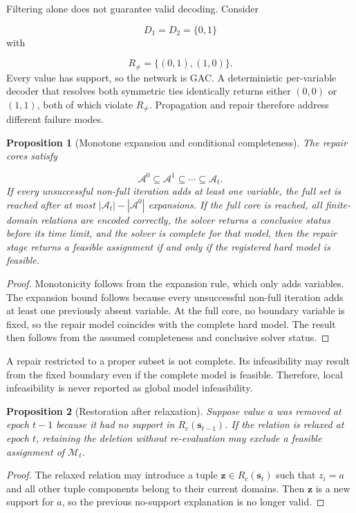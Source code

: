 \documentclass[pdflatex,sn-mathphys-num,iicol,oneside]{sn-jnl}
\newcommand{\gac}{\textsc{GAC}\xspace}
\newtheorem{proposition}{Proposition}
\begin{document}
Filtering alone does not guarantee valid decoding. Consider

\[
D_1=D_2=\{0,1\}
\]
with

\[
R_{\neq}=\{(0,1),(1,0)\}.
\]
Every value has support, so the network is \gac. A deterministic
per-variable decoder that resolves both symmetric ties identically
returns either $(0,0)$ or $(1,1)$, both of which violate
$R_{\neq}$. Propagation and repair therefore address different
failure modes.

\begin{proposition}[Monotone expansion and conditional completeness]
\label{prop:completeness}
The repair cores satisfy

\[
\mathcal{A}^{0}
\subseteq
\mathcal{A}^{1}
\subseteq
\cdots
\subseteq
\mathcal{A}_t.
\]
If every unsuccessful non-full iteration adds at least one variable,
the full set is reached after at most
$|\mathcal{A}_t|-|\mathcal{A}^{0}|$ expansions. If the full core is
reached, all finite-domain relations are encoded correctly, the solver
returns a conclusive status before its time limit, and the solver is
complete for that model, then the repair stage returns a feasible
assignment if and only if the registered hard model is feasible.
\end{proposition}

\begin{proof}
Monotonicity follows from the expansion rule, which only adds
variables. The expansion bound follows because every unsuccessful
non-full iteration adds at least one previously absent variable. At
the full core, no boundary variable is fixed, so the repair model
coincides with the complete hard model. The result then follows from
the assumed completeness and conclusive solver status.
\end{proof}

A repair restricted to a proper subset is not complete. Its
infeasibility may result from the fixed boundary even if the complete
model is feasible. Therefore, local infeasibility is never reported as
global model infeasibility.

\begin{proposition}[Restoration after relaxation]
\label{prop:restoration}
Suppose value $a$ was removed at epoch $t-1$ because it had no support
in $R_c(\bm{s}_{t-1})$. If the relation is relaxed at epoch $t$,
retaining the deletion without re-evaluation may exclude a feasible
assignment of $\mathcal{M}_t$.
\end{proposition}

\begin{proof}
The relaxed relation may introduce a tuple
$\bm{z}\in R_c(\bm{s}_t)$ such that $z_i=a$ and all other tuple
components belong to their current domains. Then $\bm{z}$ is a new
support for $a$, so the previous no-support explanation is no longer
valid.
\end{proof}
\end{document}
